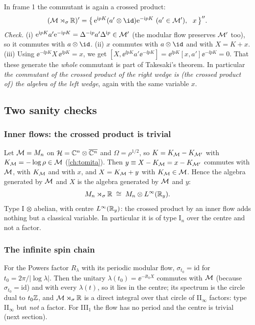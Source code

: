 In frame 1 the commutant is again a crossed product:
\begin{equation}
(\M\rtimes_\sigma\R)'=\big\{\,\ee^{\ii pK}(a'\otimes\id)\ee^{-\ii pK}\ (a'\in\M'),\ \ x\,\big\}''.
\end{equation}
\emph{Check.} (i) $\mathrm{e}^{\mathrm{i} pK}a'\mathrm{e}^{-\mathrm{i} pK}=\Delta^{-\mathrm{i} p}a'\Delta^{\mathrm{i} p}\in\mathcal{M}'$ (the modular flow preserves $\mathcal{M}'$ too), so it commutes with $a\otimes\id$. (ii) $x$ commutes with $a\otimes\id$ and with $X=K+x$. (iii) Using $\ee^{-\ii pK}X\,\ee^{\ii pK}=x$, we get $[X,\ee^{\ii pK}a'\ee^{-\ii pK}]=\ee^{\ii pK}[x,a']\ee^{-\ii pK}=0$. That these generate the \emph{whole} commutant is part of Takesaki's theorem. In particular \emph{the commutant of the crossed product of the right wedge is (the crossed product of) the algebra of the left wedge}, again with the same variable $x$.

\subsection{Two sanity checks}

\subsubsection{Inner flows: the crossed product is trivial}
Let $\mathcal{M}=M_n$ on $\mathcal{H}=\mathbb{C}^n\otimes\overline{\mathbb{C}^n}$ and $\Omega=\rho^{1/2}$, so $K=K_{\mathcal{M}}-K_{\mathcal{M}'}$ with $K_{\mathcal{M}}=-\log\rho\in\mathcal{M}$ (\cref{ch:tomita}). Then $y\equiv X-K_{\mathcal{M}}=x-K_{\mathcal{M}'}$ commutes with $\mathcal{M}$, with $K_{\mathcal{M}}$ and with $x$, and $X=K_{\mathcal{M}}+y$ with $K_{\mathcal{M}}\in\mathcal{M}$. Hence the algebra generated by $\mathcal{M}$ and $X$ is the algebra generated by $\mathcal{M}$ and $y$:
\begin{equation}
M_n\rtimes_{\sigma}\mathbb{R}\;\cong\;M_n\otimes L^\infty(\mathbb{R}_y).
\end{equation}
Type I $\otimes$ abelian, with centre $L^\infty(\mathbb{R}_y)$: the crossed product by an inner flow adds nothing but a classical variable. In particular it is of type I$_n$ over the centre and not a factor.

\subsubsection{The infinite spin chain}
For the Powers factor $R_\lambda$ with its periodic modular flow, $\sigma_{t_0}=\mathrm{id}$ for $t_0=2\pi/|\log\lambda|$. Then the unitary $\lambda(t_0)=\ee^{-\ii t_0X}$ commutes with $\mathcal{M}$ (because $\sigma_{t_0}=\mathrm{id}$) and with every $\lambda(t)$, so it lies in the centre; its spectrum is the circle dual to $t_0\mathbb{Z}$, and $\mathcal{M}\rtimes_\sigma\mathbb{R}$ is a direct integral over that circle of II$_\infty$ factors: type II$_\infty$ but \emph{not} a factor. For III$_1$ the flow has no period and the centre is trivial (next section).

